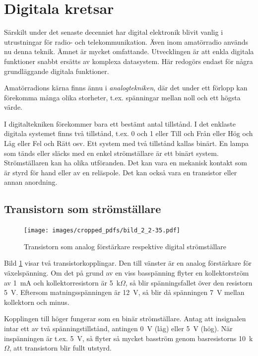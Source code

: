 \section{Digitala kretsar}
\label{digitala kretsar}

Särskilt under det senaste decenniet har digital elektronik blivit vanlig i
utrustningar för radio- och telekommunikation. Även inom amatörradio används nu
denna teknik. Ämnet är mycket omfattande. Utvecklingen är att enkla digitala
funktioner snabbt ersätts av komplexa datasystem. Här redogörs endast för några
grundläggande digitala funktioner.

Amatörradions kärna finns ännu i \emph{analogtekniken}, där det under ett
förlopp kan förekomma många olika storheter, t.ex. spänningar mellan noll och
ett högsta värde.

I digitaltekniken förekommer bara ett bestämt antal tillstånd. I det enklaste
digitala systemet finns två tillstånd, t.ex. 0 och 1 eller Till och Från eller
Hög och Låg eller Fel och Rätt osv. Ett system med två tillstånd kallas
binärt. En lampa som tänds eller släcks med en enkel strömställare är ett binärt
system. Strömställaren kan ha olika utföranden. Det kan vara en mekanisk kontakt
som är styrd för hand eller av en reläspole. Det kan också vara en transistor
eller annan anordning.

\subsection{Transistorn som strömställare}

\begin{figure}
\texttt{[image: images/cropped\_pdfs/bild\_2\_2-35.pdf]}
\caption{Transistorn som analog förstärkare respektive digital strömställare}
\label{fig:BildII2-35}
\end{figure}

Bild \ref{fig:BildII2-35} visar två transistorkopplingar.
Den till vänster är en analog förstärkare för växelspänning.
Om det på grund av en viss basspänning flyter en kollektorström av 1~mA och
kollektorresistorn är 5~k\(\Omega\), så blir spänningsfallet
över den resistorn 5~V. Eftersom matningsspänningen är 12~V, så blir då
spänningen 7~V mellan kollektorn och minus.

Kopplingen till höger fungerar som en binär strömställare. Antag att insignalen
intar ett av två spänningstillstånd, antingen 0~V (låg) eller 5~V (hög). När
inspänningen är t.ex. 5~V, så flyter så mycket basström genom basresistorns
10~k\(\Omega\), att transistorn blir fullt utstyrd.

